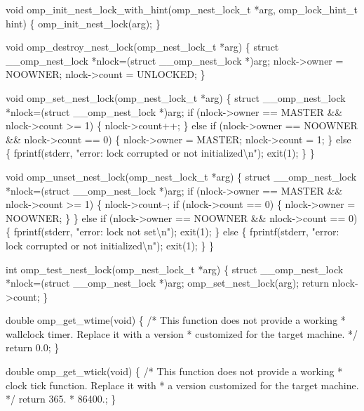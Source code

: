 {\begin{codepar}
void omp\_init\_nest\_lock\_with\_hint(omp\_nest\_lock\_t *arg, omp\_lock\_hint\_t hint)
\{
    omp\_init\_nest\_lock(arg);
\}

void omp\_destroy\_nest\_lock(omp\_nest\_lock\_t *arg)
\{
    struct \_\_omp\_nest\_lock *nlock=(struct \_\_omp\_nest\_lock *)arg;
    nlock->owner = NOOWNER;
    nlock->count = UNLOCKED;
\}

void omp\_set\_nest\_lock(omp\_nest\_lock\_t *arg)
\{
    struct \_\_omp\_nest\_lock *nlock=(struct \_\_omp\_nest\_lock *)arg;
    if (nlock->owner == MASTER \&\& nlock->count >= 1)
    \{
        nlock->count++;
    \}
    else if (nlock->owner == NOOWNER \&\& nlock->count == 0)
    \{
        nlock->owner = MASTER;
        nlock->count = 1;
    \}
    else
    \{
        fprintf(stderr, "error: lock corrupted or not initialized{\textbackslash}n");
        exit(1);
    \}
\}

void omp\_unset\_nest\_lock(omp\_nest\_lock\_t *arg)
\{
    struct \_\_omp\_nest\_lock *nlock=(struct \_\_omp\_nest\_lock *)arg;
    if (nlock->owner == MASTER \&\& nlock->count >= 1)
    \{
        nlock->count--;
        if (nlock->count == 0)
        \{
            nlock->owner = NOOWNER;
        \}
    \}
    else if (nlock->owner == NOOWNER \&\& nlock->count == 0)
    \{
        fprintf(stderr, "error: lock not set{\textbackslash}n");
        exit(1);
    \}
    else
    \{
        fprintf(stderr, "error: lock corrupted or not initialized{\textbackslash}n");
        exit(1);
    \}
\}

int omp\_test\_nest\_lock(omp\_nest\_lock\_t *arg)
\{
    struct \_\_omp\_nest\_lock *nlock=(struct \_\_omp\_nest\_lock *)arg;
    omp\_set\_nest\_lock(arg);
    return nlock->count;
\}

double omp\_get\_wtime(void)
\{
/* This function does not provide a working
 * wallclock timer. Replace it with a version
 * customized for the target machine.
 */
    return 0.0;
\}

double omp\_get\_wtick(void)
\{
/* This function does not provide a working
 * clock tick function. Replace it with
 * a version customized for the target machine.
 */
    return 365. * 86400.;
\}

\end{codepar}} %








\pagebreak
